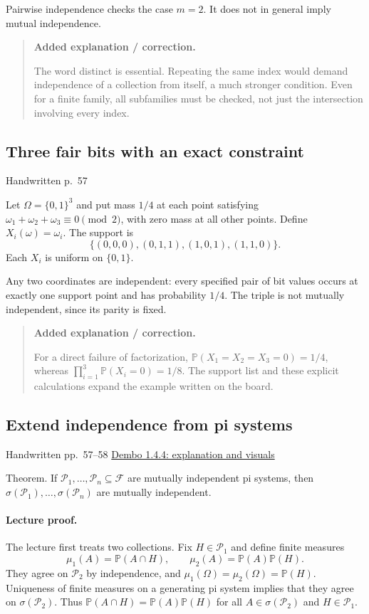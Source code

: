 \documentclass[11pt,letterpaper]{article}
\newcommand{\lecturesection}[1]{\subsection{#1}}
\begin{document}
Pairwise independence checks the case $m=2$. It does not in general imply mutual independence.

\begin{quote}\small\textbf{Added explanation / correction.}

The word distinct is essential. Repeating the same index would demand independence of a collection from itself, a much stronger condition. Even for a finite family, all subfamilies must be checked, not just the intersection involving every index.
\end{quote}

\hypertarget{l7-s4}{}
\lecturesection{Three fair bits with an exact constraint}
{\small\textcolor{lectureink}{Handwritten p.\ 57}}

Let $\Omega=\{0,1\}^3$ and put mass $1/4$ at each point satisfying $\omega_1+\omega_2+\omega_3\equiv0\pmod 2$, with zero mass at all other points. Define $X_i(\omega)=\omega_i$. The support is \[\{(0,0,0),(0,1,1),(1,0,1),(1,1,0)\}.\] Each $X_i$ is uniform on $\{0,1\}$.

Any two coordinates are independent: every specified pair of bit values occurs at exactly one support point and has probability $1/4$. The triple is not mutually independent, since its parity is fixed.

\begin{quote}\small\textbf{Added explanation / correction.}

For a direct failure of factorization, $\mathbb P(X_1=X_2=X_3=0)=1/4$, whereas $\prod_{i=1}^3\mathbb P(X_i=0)=1/8$. The support list and these explicit calculations expand the example written on the board.
\end{quote}

\hypertarget{l7-s5}{}
\lecturesection{Extend independence from pi systems}
{\small\textcolor{lectureink}{Handwritten pp.\ 57--58} \quad \href{https://josephrbailey.com/probability/\#entry-1-4-4}{Dembo 1.4.4: explanation and visuals}}

Theorem. If $\mathcal P_1,\ldots,\mathcal P_n\subseteq\mathcal F$ are mutually independent pi systems, then $\sigma(\mathcal P_1),\ldots,\sigma(\mathcal P_n)$ are mutually independent.

\paragraph{Lecture proof.}
The lecture first treats two collections. Fix $H\in\mathcal P_1$ and define finite measures \[\mu_1(A)=\mathbb P(A\cap H),\qquad \mu_2(A)=\mathbb P(A)\mathbb P(H).\] They agree on $\mathcal P_2$ by independence, and $\mu_1(\Omega)=\mu_2(\Omega)=\mathbb P(H)$. Uniqueness of finite measures on a generating pi system implies that they agree on $\sigma(\mathcal P_2)$. Thus $\mathbb P(A\cap H)=\mathbb P(A)\mathbb P(H)$ for all $A\in\sigma(\mathcal P_2)$ and $H\in\mathcal P_1$.
\end{document}
